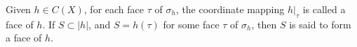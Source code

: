 Given $h \in C(X)$, for each face $\tau$ of $\sigma_h$, the coordinate mapping $h|_\tau$ is called a face of $h$. If $S \subset |h|$, and $S = h(\tau)$ for some face $\tau$ of $\sigma_h$, then $S$ is said to form a face of $h$.

